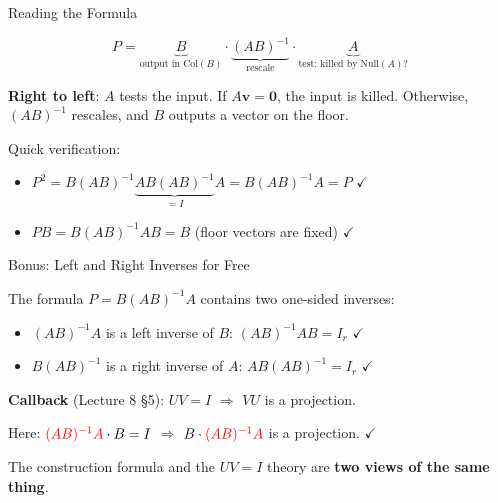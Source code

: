 \documentclass[10pt]{beamer}
\theoremstyle{definition}
\newcommand{\x}[1]{\alert{\textbf{#1}}}
\newcommand{\rd}[1]{{\color{red}#1}}                  %
\newcommand{\bl}[1]{{\color{blue}#1}}                 %
\begin{document}
\begin{frame}{Reading the Formula}

$$P = \underbrace{B}_{\text{output in Col}(B)} \cdot \underbrace{(AB)^{-1}}_{\text{rescale}} \cdot \underbrace{A}_{\text{test: killed by Null}(A)\text{?}}$$

\vspace{0.5em}

\x{Right to left}: $A$ tests the input. If $A\mathbf{v} = \mathbf{0}$, the input is killed. Otherwise, $(AB)^{-1}$ rescales, and $B$ outputs a vector on the floor.

\vspace{0.5em}

Quick verification:
\begin{itemize}
\item $P^2 = B(AB)^{-1}\underbrace{AB(AB)^{-1}}_{= I}A = B(AB)^{-1}A = P$ $\checkmark$
\item $PB = B(AB)^{-1}AB = B$ \quad (floor vectors are fixed) $\checkmark$
\end{itemize}

\end{frame}


\begin{frame}{Bonus: Left and Right Inverses for Free}

The formula $P = B(AB)^{-1}A$ contains two one-sided inverses:

\vspace{0.5em}

\begin{itemize}
\item $(AB)^{-1}A$ is a \rd{left inverse} of $B$: \quad $(AB)^{-1}AB = I_r$ $\checkmark$

\vspace{0.3em}

\item $B(AB)^{-1}$ is a \bl{right inverse} of $A$: \quad $AB(AB)^{-1} = I_r$ $\checkmark$
\end{itemize}

\vspace{0.5em}

\x{Callback} (Lecture 8 \S5): $UV = I$ $\Rightarrow$ $VU$ is a projection.

\vspace{0.3em}

Here: $\rd{(AB)^{-1}A} \cdot B = I$ $\Rightarrow$ $B \cdot \rd{(AB)^{-1}A}$ is a projection. $\checkmark$

\vspace{0.3em}

The construction formula and the $UV = I$ theory are \x{two views of the same thing}.

\end{frame}
\end{document}
